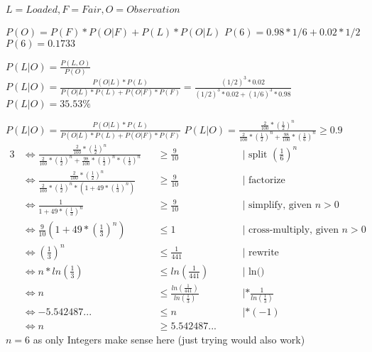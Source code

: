 $L = Loaded, F = Fair, O = Observation$

$P(O) = P(F)* P(O|F)+ P(L) * P(O|L)$
$P(6) = 0.98*1/6 + 0.02*1/2$
$P(6) = 0.1733$


$P(L|O) = \frac{P(L,O)}{P(O)}$
$P(L|O) = \frac{P(O|L)*P(L)}{P(O|L)*P(L) + P(O|F)*P(F)} = \frac{(1/2)^3*0.02}{(1/2)^3*0.02 + (1/6)^3*0.98}$
$P(L|O) = 35.53\%$


$P(L|O) = \frac{P(O|L)*P(L)}{P(O|L)*P(L) + P(O|F)*P(F)}$
$P(L|O) = \frac{\frac{2}{100}*(\frac{1}{2})^n}{\frac{2}{100}*(\frac{1}{2})^n + \frac{98}{100}*(\frac{1}{6})^n} \geq 0.9$
\begin{alignat}{3}
&\iff \frac{\frac{2}{100}*(\frac{1}{2})^n}{\frac{2}{100}*(\frac{1}{2})^n + \frac{98}{100}*(\frac{1}{2})^n * (\frac{1}{3})^n} &&\geq \frac{9}{10}  &&\quad| \text{ split } (\frac{1}{6})^n\\
&\iff \frac{\frac{2}{100}*(\frac{1}{2})^n}{\frac{2}{100}*(\frac{1}{2})^n * (1 + 49 * (\frac{1}{3})^n)} &&\geq \frac{9}{10}  &&\quad| \text{ factorize}\\
&\iff \frac{1}{1 + 49 * (\frac{1}{3})^n} &&\geq \frac{9}{10} &&\quad| \text{ simplify, given } n > 0\\
&\iff \frac{9}{10} (1 + 49 * (\frac{1}{3})^n) &&\leq 1  &&\quad| \text{ cross-multiply, given } n > 0\\
&\iff (\frac{1}{3})^n &&\leq \frac{1}{441} &&\quad| \text{ rewrite }\\
&\iff n * ln(\frac{1}{3}) &&\leq ln(\frac{1}{441}) &&\quad| \text{ ln() }\\
&\iff n &&\leq \frac{ln(\frac{1}{441})}{ln(\frac{1}{3})} &&\quad| *\frac{1}{ln(\frac{1}{3})} \\
&\iff -5.542487... &&\leq n &&\quad| * (-1)\\
&\iff n &&\geq 5.542487...
\end{alignat}
$n = 6$ as only Integers make sense here (just trying would also work)
